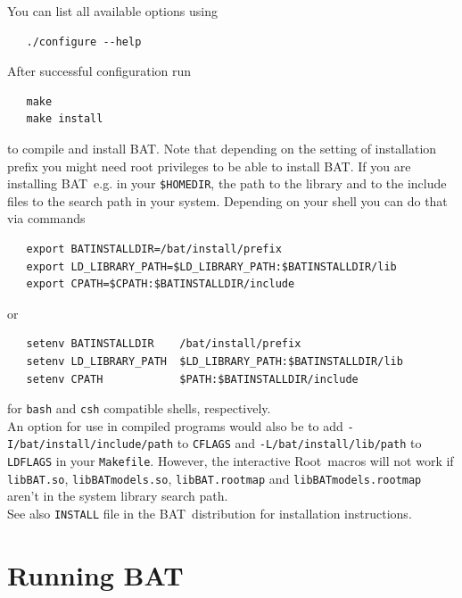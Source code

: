 \documentclass[11pt, a4paper]{article}
\newcommand{\bat}{{\sc BAT}}
\newcommand{\Root}{{\sc Root}}
\begin{document}
\noindent
You can list all available options using
%
\begin{verbatim}
   ./configure --help
\end{verbatim}

\enlargethispage{1cm}

\noindent
After successful configuration run
%
\begin{verbatim}
   make
   make install
\end{verbatim}
%
to compile and install \bat. Note that depending on the setting of
installation prefix you might need root privileges to be able to
install \bat. If you are installing \bat\ e.g. in your
\verb|$HOMEDIR|, %
the path to the library and to the include files to the search path in
your system. Depending on your shell you can do that via commands
%
\begin{verbatim}
   export BATINSTALLDIR=/bat/install/prefix
   export LD_LIBRARY_PATH=$LD_LIBRARY_PATH:$BATINSTALLDIR/lib
   export CPATH=$CPATH:$BATINSTALLDIR/include
\end{verbatim}
%
or
%
\begin{verbatim}
   setenv BATINSTALLDIR    /bat/install/prefix
   setenv LD_LIBRARY_PATH  $LD_LIBRARY_PATH:$BATINSTALLDIR/lib
   setenv CPATH            $PATH:$BATINSTALLDIR/include
\end{verbatim}
%
for \verb|bash| and \verb|csh| compatible shells, respectively. \\

\noindent
An option for use in compiled programs would also be to add
\verb|-I/bat/install/include/path| to \verb|CFLAGS| and
\verb|-L/bat/install/lib/path| to \verb|LDFLAGS| in your
\verb|Makefile|. However, the interactive \Root\ macros will not work if
\verb|libBAT.so|, \verb|libBATmodels.so|, \verb|libBAT.rootmap| and
\verb|libBATmodels.rootmap| aren't in the system library search path. \\

\noindent
See also \verb|INSTALL| file in the \bat\ distribution for installation instructions.



\section{Running \bat}
\label{section:running}
\end{document}
